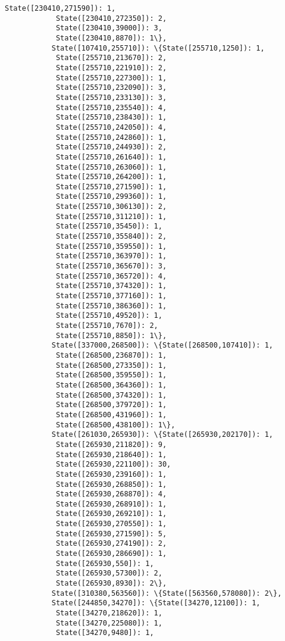 \documentclass[11pt]{article}
\begin{document}
\begin{Verbatim}[commandchars=\\\{\}]
            State([230410,271590]): 1,
            State([230410,272350]): 2,
            State([230410,39000]): 3,
            State([230410,8870]): 1\},
           State([107410,255710]): \{State([255710,1250]): 1,
            State([255710,213670]): 2,
            State([255710,221910]): 2,
            State([255710,227300]): 1,
            State([255710,232090]): 3,
            State([255710,233130]): 3,
            State([255710,235540]): 4,
            State([255710,238430]): 1,
            State([255710,242050]): 4,
            State([255710,242860]): 1,
            State([255710,244930]): 2,
            State([255710,261640]): 1,
            State([255710,263060]): 1,
            State([255710,264200]): 1,
            State([255710,271590]): 1,
            State([255710,299360]): 1,
            State([255710,306130]): 2,
            State([255710,311210]): 1,
            State([255710,35450]): 1,
            State([255710,355840]): 2,
            State([255710,359550]): 1,
            State([255710,363970]): 1,
            State([255710,365670]): 3,
            State([255710,365720]): 4,
            State([255710,374320]): 1,
            State([255710,377160]): 1,
            State([255710,386360]): 1,
            State([255710,49520]): 1,
            State([255710,7670]): 2,
            State([255710,8850]): 1\},
           State([337000,268500]): \{State([268500,107410]): 1,
            State([268500,236870]): 1,
            State([268500,273350]): 1,
            State([268500,359550]): 1,
            State([268500,364360]): 1,
            State([268500,374320]): 1,
            State([268500,379720]): 1,
            State([268500,431960]): 1,
            State([268500,438100]): 1\},
           State([261030,265930]): \{State([265930,202170]): 1,
            State([265930,211820]): 9,
            State([265930,218640]): 1,
            State([265930,221100]): 30,
            State([265930,239160]): 1,
            State([265930,268850]): 1,
            State([265930,268870]): 4,
            State([265930,268910]): 1,
            State([265930,269210]): 1,
            State([265930,270550]): 1,
            State([265930,271590]): 5,
            State([265930,274190]): 2,
            State([265930,286690]): 1,
            State([265930,550]): 1,
            State([265930,57300]): 2,
            State([265930,8930]): 2\},
           State([310380,563560]): \{State([563560,578080]): 2\},
           State([244850,34270]): \{State([34270,12100]): 1,
            State([34270,218620]): 1,
            State([34270,225080]): 1,
            State([34270,9480]): 1,

\end{Verbatim}
\end{document}
